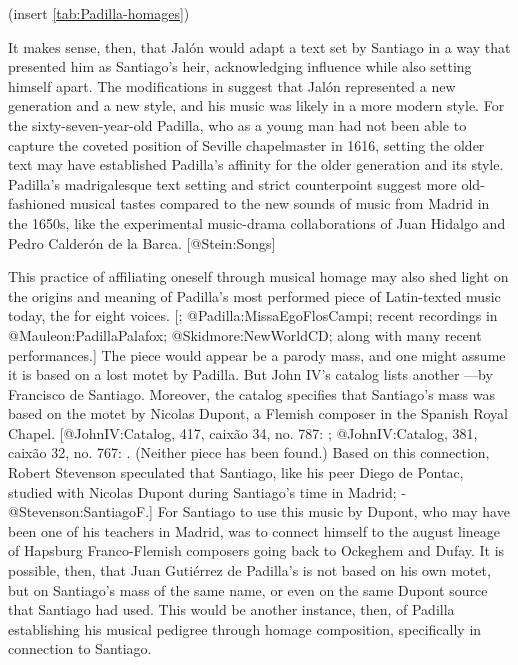 (insert \cref{tab:Padilla-homages})
\label{tab:Padilla-homages}

It makes sense, then, that Jalón would adapt a text set by Santiago in a way
that presented him as Santiago's heir, acknowledging influence while also
setting himself apart.
The modifications in  suggest that Jalón represented a
new generation and a new style, and his music was likely in a more modern style.
For the sixty-seven-year-old Padilla, who as a young man had not been able to
capture the coveted position of Seville chapelmaster in 1616, setting the older
text may have established Padilla's affinity for the older generation and its
style.
Padilla's madrigalesque text setting and strict counterpoint suggest more
old-fashioned musical tastes compared to the new sounds of music from Madrid in
the 1650s, like the experimental music-drama collaborations of Juan Hidalgo
and Pedro Calderón de la Barca.
[@Stein:Songs]

This practice of affiliating oneself through musical homage may also shed light
on the origins and meaning of Padilla's most performed piece of Latin-texted
music today, the  for eight voices.
[; @Padilla:MissaEgoFlosCampi; recent recordings in
@Mauleon:PadillaPalafox; @Skidmore:NewWorldCD; along with many recent
performances.]
The piece would appear be a parody mass, and one might assume it is based on a
lost motet  by Padilla.
But John IV's catalog lists another ---by Francisco de
Santiago.
Moreover, the catalog specifies that Santiago's mass was based on the motet
 by Nicolas Dupont, a Flemish composer in the Spanish Royal
Chapel.
[@JohnIV:Catalog, 417, caixão 34, no. 787: 
; @JohnIV:Catalog, 381, caixão 32, no. 767: .
(Neither piece has been found.)
Based on this connection, Robert Stevenson speculated that Santiago, like his
peer Diego de Pontac, studied with Nicolas Dupont during Santiago's time in
Madrid; -@Stevenson:SantiagoF.]
For Santiago to use this music by Dupont, who may have been one of his teachers
in Madrid, was to connect himself to the august lineage of Hapsburg
Franco-Flemish composers going back to Ockeghem and Dufay.
It is possible, then, that Juan Gutiérrez de Padilla's 
is not based on his own motet, but on Santiago's mass of the same name, or even
on the same Dupont source that Santiago had used.
This would be another instance, then, of Padilla establishing his musical
pedigree through homage composition, specifically in connection to Santiago.


